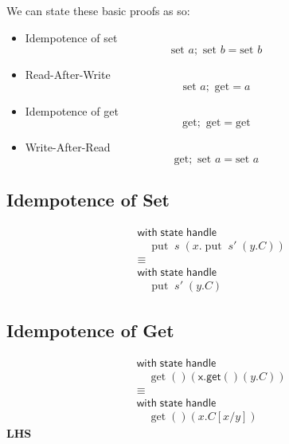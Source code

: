 \documentclass[logo,bsc,singlespacing,parskip]{infthesis}
\begin{document}
We can state these basic proofs as so:
\begin{itemize}
    \item Idempotence of set
    \[
    \text{set } a; \text{ set } b = \text{set } b
    \]
    
    \item Read-After-Write 
    \[
    \text{set } a; \text{ get} = a
    \]
    
    \item Idempotence of get
    \[
    \text{get}; \text{ get} = \text{get}
    \]
    
    \item Write-After-Read 
    \[
    \text{get}; \text{ set } a = \text{set } a
    \]
\end{itemize}

\subsection*{Idempotence of Set}

\[
\begin{aligned}
    &\mathsf{with} \; \mathsf{state} \; \mathsf{handle} \\
    &\quad \operatorname{put} \; s \; (x. \operatorname{put} \; s' \; (y. C)) \\
    &\equiv \\
    &\mathsf{with} \; \mathsf{state} \; \mathsf{handle} \\
    &\quad \operatorname{put} \; s' \; (y. C)
\end{aligned}
\]

\subsection*{Idempotence of Get}



\[
\begin{aligned}
    &\mathsf{with} \; \mathsf{state} \; \mathsf{handle} \\
    &\quad \operatorname{get}() \left( \mathsf{x.get}() \left( y.C \right) \right) \\
    &\equiv \\
    &\mathsf{with} \; \mathsf{state} \; \mathsf{handle} \\
    &\quad \operatorname{get}() \left( x.C[x/y] \right)
\end{aligned}
\]
\noindent\textbf{LHS}
\end{document}

